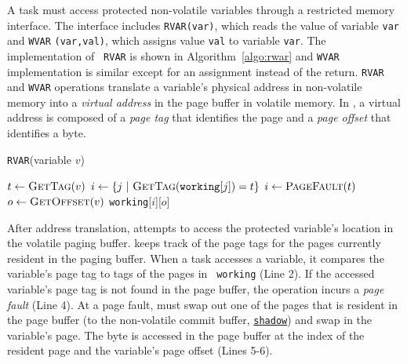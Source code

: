 A \sys task must access protected non-volatile variables through a restricted memory
interface. The interface includes \texttt{RVAR(var)}, which reads the value of
variable {\tt var} and \texttt{WVAR} \texttt{(var,val)}, which assigns
value {\tt val} to variable {\tt var}. The implementation of {\tt
RVAR} is shown in Algorithm~\ref{algo:rwar} and {\tt WVAR} implementation is
similar except for an assignment instead of the return.
%
{\tt RVAR} and {\tt WVAR} operations translate a variable's physical address in non-volatile memory into a \emph{virtual address} in the page buffer in volatile memory.  In \sys, a virtual address is composed of a \emph{page tag} that identifies the page and a \emph{page offset} that identifies a byte.


\begin{algorithm}[t]
	\caption{\texttt{RVAR}(variable $v$)}
	\label{algo:rwar}
	\scriptsize
	\begin{algorithmic}[1]
		\State $t \leftarrow \Call{GetTag}{v}$ 
        \State $i \gets \{ j\ |\ \Call{GetTag}{\texttt{working}[j]} = t \}$ 
		 
		\State	$i \gets \Call{PageFault}{t}$ 
		\EndIf
		\State $o \leftarrow \Call{GetOffset}{v}$ 		
		\State \Return \texttt{working}[$i$][$o$]  
	\end{algorithmic}
\end{algorithm}

After address translation, \sys attempts to access the protected variable's
location in the volatile paging buffer. \sys keeps track of the page tags for
the pages currently resident in the paging buffer. When a task accesses a
variable, it compares the variable's page tag to tags of the pages in {\tt
working} (Line 2).
%
%
If the accessed variable's page tag is not found in the page buffer, the
operation incurs a {\em page fault} (Line 4). At a page fault, \sys must swap
out one of the pages that is resident in the page buffer (to the non-volatile
commit buffer, \texttt{\underline{shadow}}) and swap in the variable's page.
%
The byte is accessed in the page buffer at the index of the resident page and
the variable's page offset (Lines 5-6).

